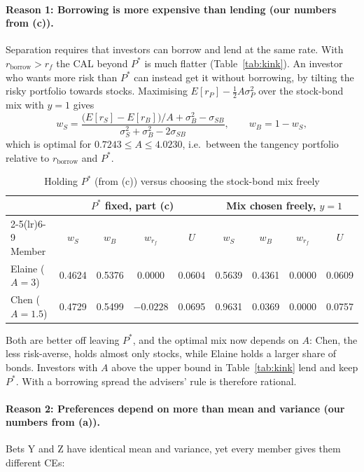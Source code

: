 \documentclass[11pt]{article}
\newcommand{\rb}{r_{\text{borrow}}}
\newcommand{\Er}[1]{E[r_{#1}]}
\begin{document}
\paragraph{Reason 1: Borrowing is more expensive than lending (our numbers from (c)).}
Separation requires that investors can borrow and lend at the same rate. With $\rb > r_f$ the CAL beyond $P^*$ is much flatter (Table~\ref{tab:kink}). An investor who wants more risk than $P^*$ can instead get it without borrowing, by tilting the risky portfolio towards stocks. Maximising $\Er{P} - \tfrac12 A\sigma_P^2$ over the stock-bond mix with $y = 1$ gives
\[
w_S = \frac{\bigl(\Er{S} - \Er{B}\bigr)/A + \sigma_B^2 - \sigma_{SB}}{\sigma_S^2 + \sigma_B^2 - 2\sigma_{SB}}, \qquad w_B = 1 - w_S,
\]
which is optimal for $0.7243 \le A \le 4.0230$, i.e.\ between the tangency portfolio relative to $\rb$ and $P^*$.

\begin{table}[H]
\centering
\caption{Holding $P^*$ (from (c)) versus choosing the stock-bond mix freely}
\begin{tabular}{lcccccccc}
\toprule
& \multicolumn{4}{c}{$P^*$ fixed, part (c)} & \multicolumn{4}{c}{Mix chosen freely, $y = 1$} \\
\cmidrule(lr){2-5}\cmidrule(lr){6-9}
Member & $w_S$ & $w_B$ & $w_{r_f}$ & $U$ & $w_S$ & $w_B$ & $w_{r_f}$ & $U$ \\
\midrule
Elaine ($A = 3$)   & 0.4624 & 0.5376 & 0.0000    & 0.0604 & 0.5639 & 0.4361 & 0.0000 & 0.0609 \\
Chen ($A = 1.5$)   & 0.4729 & 0.5499 & $-0.0228$ & 0.0695 & 0.9631 & 0.0369 & 0.0000 & 0.0757 \\
\bottomrule
\end{tabular}
\end{table}

\noindent Both are better off leaving $P^*$, and the optimal mix now depends on $A$: Chen, the less risk-averse, holds almost only stocks, while Elaine holds a larger share of bonds. Investors with $A$ above the upper bound in Table~\ref{tab:kink} lend and keep $P^*$. With a borrowing spread the advisers' rule is therefore rational.

\paragraph{Reason 2: Preferences depend on more than mean and variance (our numbers from (a)).}
Bets Y and Z have identical mean and variance, yet every member gives them different CEs:
\end{document}
